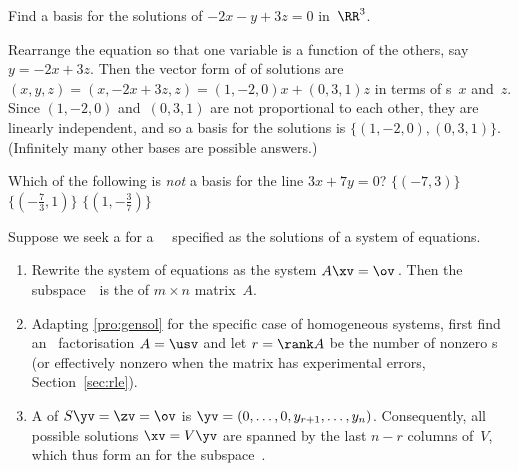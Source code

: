 \begin{example} \label{eg:}
Find a basis for the solutions of \(-2x-y+3z=0\) in~\(\RR^3\).
\begin{solution} 
Rearrange the equation so that one variable is a function of the others, say \(y=-2x+3z\).
Then the vector form of of solutions are \((x,y,z)=(x,-2x+3z,z)=(1,-2,0)x+(0,3,1)z\) in terms of s~\(x\) and~\(z\).
Since \((1,-2,0)\) and~\((0,3,1)\) are not proportional to each other, they are linearly independent, and so a basis for the solutions is \(\{(1,-2,0),(0,3,1)\}\).
(Infinitely many other bases are possible answers.)
\end{solution}
\end{example}



\begin{activity}
Which of the following is \emph{not} a basis for the line \(3x+7y=0\)?
{\(\{(-7,3)\}\)}
{\(\{(-\frac73,1)\}\)}
{\(\{(1,-\frac37)\}\)}
\end{activity}





\begin{procedure} \label{pro:bfe}
Suppose we seek a  for a ~\WW\ specified as the solutions of a system of equations.
\begin{enumerate}
\item Rewrite the system of equations as the  system \(A\xv=\ov\)\,. 
Then the subspace~\WW\ is the  of \(m\times n\) matrix~\(A\).
\item  Adapting \autoref{pro:gensol} for the specific case of homogeneous systems, first find an \svd\ factorisation \(A=\usv\) and let \(r=\rank A\) be the number of nonzero s (or effectively nonzero when the matrix has experimental errors, Section~\ref{sec:rle}).
\item A  of \(S\yv=\zv=\ov\) is \(\yv=(0,\ldots,0,y_{r+1},\ldots,y_n)\).
Consequently, all possible solutions \(\xv=V\yv\) are spanned by the last \(n-r\) columns of~\(V\), which thus form an  for the subspace~\WW.
\end{enumerate}
\end{procedure}


